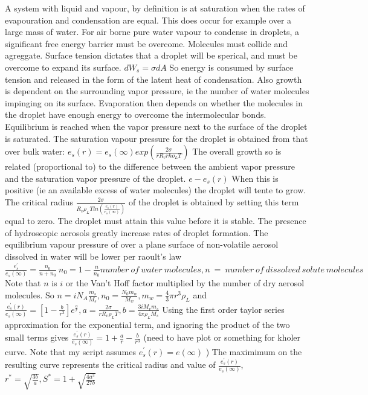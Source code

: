 \documentclass[11pt]{article} %
\begin{document}
A system with liquid and vapour, by definition is at saturation when the rates of evapouration and condensation are equal.  This does occur for example over a large mass of water.  For air borne pure water vapour to condense in droplets, a significant free energy barrier must be overcome.  Molecules must collide and agreggate.  Surface tension dictates that a droplet will be sperical, and must be overcome to expand its surface. $dW_{s} = \sigma dA $ So energy is consumed by surface tension and released in the form of the latent heat of condensation.  Also growth is dependent on the surrounding vapor pressure, ie the number of water molecules impinging on its surface.  Evaporation then depends on whether the molecules in the droplet have enough energy to overcome the intermolecular bonds.  Equilibrium is reached when the vapor pressure next to the surface of the droplet is saturated. The saturation vapour pressure for the droplet is obtained from that over bulk water: $e_{s}(r) = e_{s}(\infty) exp(\frac{2 \sigma}{r R_{v}rho_{L} T})$  The overall growth so is related (proportional to) to the difference between the ambient vapor pressure and the saturation vapor pressure of the droplet. $e - e_{s}(r)$ When this is positive (ie an available excess of water molecules) the droplet will tente to grow.  The critical radius $\frac{2\sigma}{R_{v}\rho_{L}T ln(\frac{e_{s}(r)}{e_{s}(\infty)})}$ of the droplet is obtained by setting this term equal to zero.  The droplet must attain this value before it is stable.  The presence of hydroscopic aerosols greatly increase rates of droplet formation.  The equilibrium vapour pressure of over a plane surface of non-volatile aerosol dissolved in water will be lower per raoult's law $\frac{e^{'}_{s}}{e_{s}(\infty)} = \frac{n_{0}}{n + n_{0}}\ n_{0} = 1 - \frac{n}{n_{0}} number \ of \ water \ molecules, n \ = \ number \ of \ dissolved \ solute \ molecules$ Note that $n$  is $i$ or the Van't Hoff factor multiplied by the number of dry aerosol molecules. So $n = iN_{A}\frac{m_{s}}{M_{s}}, n_{0} = \frac{N_{0}m_{w}}{M_{w}}, m_{w} = \frac{4}{3} \pi r^{3} \rho_{L}$ and $\frac{e^{'}_{s}(r)}{e_{s}(\infty)} = [1 - \frac{b}{r^{3}}]e^{\frac{a}{r}}, a = \frac{2 \sigma}{r R_{v} \rho_{L}T}, b = \frac{3iM_{v} m_{s}}{4 \pi \rho_{L} M_{s}}$  Using the first order taylor series approximation for the exponential term, and ignoring the product of the two small terms gives $\frac{e^{'}_{s}(r)}{e_{s}(\infty)} = 1 + \frac{a}{r} - \frac{b}{r^{3}}$  (need to have plot or something for kholer curve.  Note that my script assumes $e^{'}_{s}(r) = e(\infty)$  ) The maximimum on the resulting curve represents the critical radius and value  of $\frac{e^{'}_{s}(r)}{e_{s}(\infty)}$, $r^{*} = \sqrt{\frac{3b}{a}}, S^{*} = 1 + \sqrt{\frac{4a^{3}}{27b}}$
\end{document}
